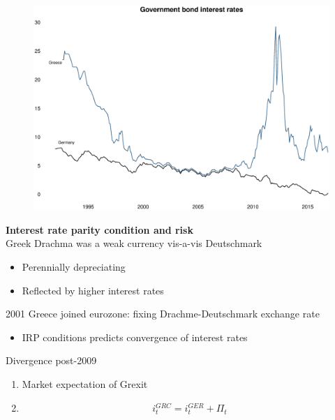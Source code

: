 \documentclass{beamer}
\begin{document}
\begin{frame}
  \begin{figure}
    \includegraphics[scale=.3]{government_bonds.eps}
  \end{figure}
\end{frame}

\begin{frame}
  \textbf{Interest rate parity condition and risk}\\
  Greek Drachma was a weak currency vis-a-vis Deutschmark
  \begin{itemize}
    \item Perennially depreciating
    \item Reflected by higher interest rates
  \end{itemize}
  2001 Greece joined eurozone: fixing Drachme-Deutschmark exchange rate
  \begin{itemize}
    \item IRP conditions predicts convergence of interest rates
  \end{itemize}
  \medskip
  Divergence post-2009
  \begin{enumerate}
    \item Market expectation of Grexit
    \item \begin{align*} i^{GRC}_t = i^{GER}_t + \Pi_t    \end{align*}
 \end{enumerate}

\end{frame}
\end{document}
